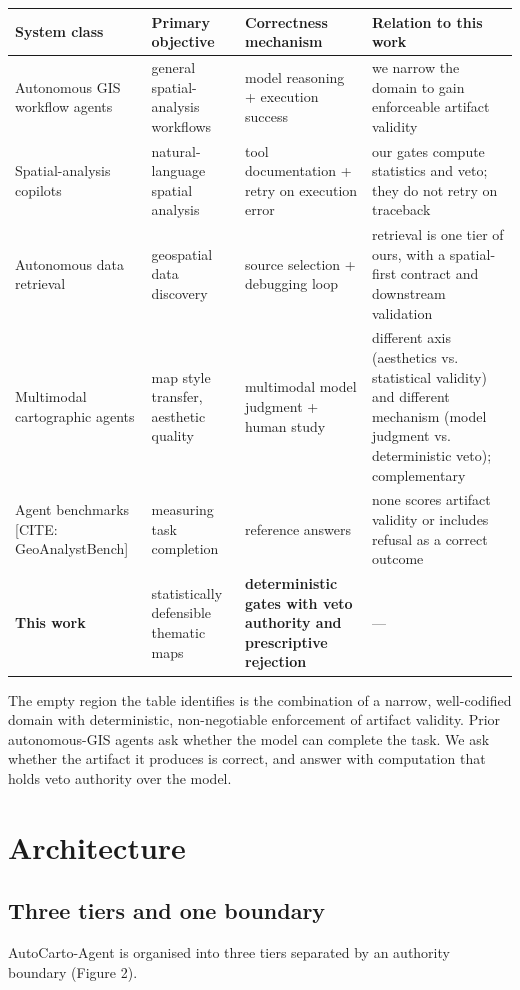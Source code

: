 \begin{table}[htbp]
\centering
\small
\begin{tabular}{p{}p{}p{}p{}}
\toprule
System class & Primary objective & Correctness mechanism & Relation to this work \\
\midrule
Autonomous GIS workflow agents \cite{li2023autonomous,li2025giscience} & general spatial-analysis workflows & model reasoning + execution success & we narrow the domain to gain enforceable artifact validity \\
Spatial-analysis copilots \cite{akinboyewa2025giscopilot} & natural-language spatial analysis & tool documentation + retry on execution error & our gates compute statistics and veto; they do not retry on traceback \\
Autonomous data retrieval \cite{ning2025llmfind} & geospatial data discovery & source selection + debugging loop & retrieval is one tier of ours, with a spatial-first contract and downstream validation \\
Multimodal cartographic agents \cite{wang2025cartoagent} & map style transfer, aesthetic quality & multimodal model judgment + human study & different axis (aesthetics vs. statistical validity) and different mechanism (model judgment vs. deterministic veto); complementary \\
Agent benchmarks \cite{krechetova2025geobenchx} [CITE: GeoAnalystBench] & measuring task completion & reference answers & none scores artifact validity or includes refusal as a correct outcome \\
\textbf{This work} & statistically defensible thematic maps & \textbf{deterministic gates with veto authority and prescriptive rejection} & --- \\
\bottomrule
\end{tabular}
\end{table}
The empty region the table identifies is the combination of a narrow, well-codified domain with deterministic, non-negotiable enforcement of artifact validity. Prior autonomous-GIS agents ask whether the model can complete the task. We ask whether the artifact it produces is correct, and answer with computation that holds veto authority over the model.

\section{Architecture}
\subsection{Three tiers and one boundary}
AutoCarto-Agent is organised into three tiers separated by an authority boundary (Figure 2).

